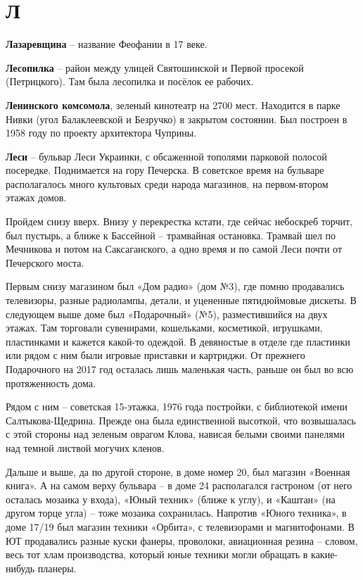 \chapter*{Л}

\textbf{Лазаревщина} – название Феофании в 17 веке.\\

\medskip


\textbf{Лесопилка} – район между улицей Святошинской и Первой просекой (Петрицкого). Там была лесопилка и посёлок ее рабочих.\\

\medskip


\textbf{Ленинского комсомола}, зеленый кинотеатр на 2700 мест. Находится в парке Нивки (угол Балаклеевской и Безручко) в закрытом состоянии. Был построен в 1958 году по проекту архитектора Чуприны.\\


\medskip


\textbf{Леси} – бульвар Леси Украинки, с обсаженной тополями парковой полосой посередке. По\-днимается на гору Печерска. В советское время на бульваре располагалось много культовых среди народа магазинов, на первом-втором этажах домов.

Пройдем снизу вверх. Внизу у перекрестка кстати, где сейчас небоскреб торчит, был пустырь, а ближе к Бассейной – трамвайная остановка. Трамвай шел по Мечникова и потом на Саксаганского, а одно время и по самой Леси почти от Печерского моста. 

Первым снизу магазином был «Дом радио» (дом №3), где помню продавались телевизоры, разные радиолампы, детали, и уцененные пятидюймовые дискеты. В следующем выше доме был «Подарочный» (№5), разместившийся на двух этажах. Там торговали сувенирами, кошельками, косметикой, игрушками, пластинками и кажется какой-то одеждой. В девяностые в отделе где пластинки или рядом с ним были игровые приставки и картриджи. От прежнего Подарочного на 2017 год осталась лишь маленькая часть, раньше он был во всю протяженность дома. 

Рядом с ним – советская 15-этажка, 1976 года постройки, с библиотекой имени Салтыкова-Щедрина. Прежде она была единственной высоткой, что возвышалась с этой стороны над зеленым оврагом Клова, нависая белыми своими панелями над темной листвой могучих кленов.

Дальше и выше, да по другой стороне, в доме номер 20, был магазин «Военная книга». А на самом верху бульвара – в доме 24 располагался гастроном (от него осталась мозаика у входа), «Юный техник» (ближе к углу), и «Каштан» (на другом торце угла) – тоже мозаика сохранилась. Напротив «Юного техника», в доме 17/19 был магазин техники «Орбита», с телевизорами и магнитофонами. В ЮТ продавались разные куски фанеры, проволоки, авиационная резина – словом, весь тот хлам производства, который юные техники могли обращать в какие-нибудь планеры.\\

